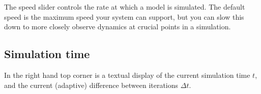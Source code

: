 \label{Speedslider}
\begin{center}
\par\end{center}

The speed slider controls the rate at which a model is simulated.
The default speed is the maximum speed your system can support, but
you can slow this down to more closely observe dynamics at crucial
points in a simulation.

\subsection{Simulation time}

\label{SimTime}

In the right hand top corner is a textual display of the current simulation
time $t$, and the current (adaptive) difference between iterations
$\Delta t$.
